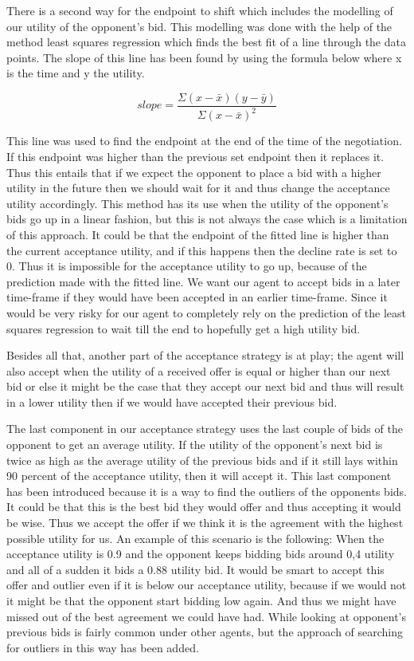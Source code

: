 \documentclass{article}
\begin{document}
\begin{enumerate}
\begin{itemize}
There is a second way for the endpoint to shift which includes the modelling of our utility of the opponent's bid. This modelling was done with the help of the method least squares regression which finds the best fit of a line through the data points. The slope of this line has been found by using the formula below where x is the time and y the utility.

\[ slope = \frac { \Sigma (x-\bar{x} )(y-\bar{y} )} {\Sigma (x- \bar{x} )^2} \]

This line was used to find the endpoint at the end of the time of the negotiation. If this endpoint was higher than the previous set endpoint then it replaces it. Thus this entails that if we expect the opponent to place a bid with a higher utility in the future then we should wait for it and thus change the acceptance utility accordingly. This method has its use when the utility of the opponent's bids go up in a linear fashion, but this is not always the case which is a limitation of this approach. It could be that the endpoint of the fitted line is higher than the current acceptance utility, and if this happens then the decline rate is set to 0. Thus it is impossible for the acceptance utility to go up, because of the prediction made with the fitted line. We want our agent to accept bids in a later time-frame if they would have been accepted in an earlier time-frame. Since it would be very risky for our agent to completely rely on the prediction of the least squares regression to wait till the end to hopefully get a high utility bid. 

Besides all that, another part of the acceptance strategy is at play; the agent will also accept when the utility of a received offer is equal or higher than our next bid or else it might be the case that they accept our next bid and thus will result in a lower utility then if we would have accepted their previous bid. \cite{baarslag}

\quad The last component in our acceptance strategy uses the last couple of bids of the opponent to get an average utility. If the utility of the opponent's next bid is twice as high as the average utility of the previous bids and if it still lays within 90 percent of the acceptance utility, then it will accept it. This last component has been introduced because it is a way to find the outliers of the opponents bids. It could be that this is the best bid they would offer and thus accepting it would be wise. Thus we accept the offer if we think it is the agreement with the highest possible utility for us. An example of this scenario is the following: When the acceptance utility is 0.9 and the opponent keeps bidding bids around 0,4 utility and all of a sudden it bids a 0.88 utility bid. It would be smart to accept this offer and outlier even if it is below our acceptance utility, because if we would not it might be that the opponent start bidding low again. And thus we might have missed out of the best agreement we could have had. While looking at opponent's previous bids is fairly common under other agents, but the approach of searching for outliers in this way has been added. 



\end{itemize}
\end{enumerate}
\end{document}
